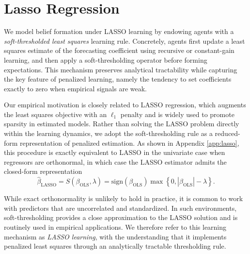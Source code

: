 \section{Lasso Regression}\label{sec:lasso}

We model belief formation under LASSO learning by endowing agents with a \emph{soft-thresholded least squares} learning rule. Concretely, agents first update a least squares estimate of the forecasting coefficient using recursive or constant-gain learning, and then apply a soft-thresholding operator before forming expectations. This mechanism preserves analytical tractability while capturing the key feature of penalized learning, namely the tendency to set coefficients exactly to zero when empirical signals are weak.

Our empirical motivation is closely related to LASSO regression, which augments the least squares objective with an $\ell_1$ penalty and is widely used to promote sparsity in estimated models. 
Rather than solving the LASSO problem directly within the learning dynamics, we adopt the soft-thresholding rule as a reduced-form representation of penalized estimation. 
As shown in Appendix \ref{app:lasso}, this procedure is exactly equivalent to LASSO in the univariate case when regressors are orthonormal, in which case the LASSO estimator admits the closed-form representation
\begin{equation}\label{eq:lasso_from_ols}
\hat{\beta}_{\text{LASSO}}
=
S(\beta_{\text{OLS}},\lambda)
=
\mathrm{sign}(\beta_{\text{OLS}})
\max\!\left\{0,|\beta_{\text{OLS}}|-\lambda\right\}.
\end{equation}

While exact orthonormality is unlikely to hold in practice, it is common to work with predictors that are uncorrelated and standardized. In such environments, soft-thresholding provides a close approximation to the LASSO solution and is routinely used in empirical applications. We therefore refer to this learning mechanism as \emph{LASSO learning}, with the understanding that it implements penalized least squares through an analytically tractable thresholding rule.

